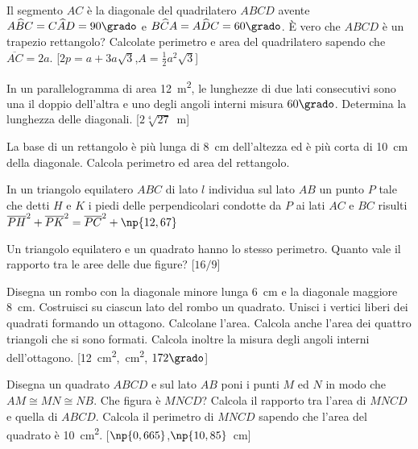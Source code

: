 \begin{multicols}{2}
\begin{esercizio}
\label{ese:7.34}
Il segmento \(AC\) è la diagonale del quadrilatero \(ABCD\) avente 
\(A\widehat{B}C=C\widehat{A}D=90\grado\) e 
\(B\widehat{C}A=A\widehat{D}C=60\grado\). \`E vero che \(ABCD\) è un 
trapezio rettangolo? Calcolate perimetro e area del quadrilatero 
sapendo che \(\overline{AC}=2a\).
\hfill[\(2p=a+3a\sqrt{3}\),\quad \(A=\frac{1}{2}a^2\sqrt{3}\)]
\end{esercizio}

\begin{esercizio}
\label{ese:7.36}
In un parallelogramma di area 12~m\textsuperscript{2}, le lunghezze 
di due lati consecutivi sono una il doppio dell'altra e uno degli 
angoli interni misura \(60\grado\). Determina la lunghezza delle 
diagonali.
\hfill[\(2\sqrt[4]{27}\)~m]
\end{esercizio}

\begin{esercizio}
\label{ese:7.38}
La base di un rettangolo è più lunga di 8~cm dell'altezza ed è più 
corta di 10~cm della diagonale. Calcola perimetro ed area del 
rettangolo.
\end{esercizio}

\begin{esercizio}
\label{ese:7.39}
In un triangolo equilatero \(ABC\) di lato \(l\) individua sul lato \(AB\) 
un punto \(P\) tale che detti \(H\) e \(K\) i piedi delle perpendicolari 
condotte da \(P\) ai lati \(AC\) e \(BC\) risulti 
\(\overline{PH}^2+\overline{PK}^2=\overline{PC}^2+\np{12,67}\)
\end{esercizio}

\begin{esercizio}
\label{ese:7.40}
Un triangolo equilatero e un quadrato hanno lo stesso perimetro. 
Quanto vale il rapporto tra le aree delle due figure?
\hfill[\(16/9\)]
\end{esercizio}

\begin{esercizio}
\label{ese:7.43}
Disegna un rombo con la diagonale minore lunga 6~cm e la diagonale 
maggiore 8~cm. Costruisci su ciascun lato del rombo un quadrato. 
Unisci i vertici liberi dei quadrati formando un ottagono. Calcolane 
l'area. Calcola anche l'area dei quattro triangoli che si sono 
formati. Calcola inoltre la misura degli angoli interni dell'ottagono.
\hfill[12~cm\textsuperscript{2},~cm\textsuperscript{2},\quad 
\(172\grado\)]
\end{esercizio}

\begin{esercizio}
\label{ese:7.44}
Disegna un quadrato \(ABCD\) e sul lato \(AB\) poni i punti \(M\) ed \(N\) in 
modo che \(AM\cong MN\cong NB\). Che figura è \(MNCD\)? Calcola il 
rapporto tra l'area di \(MNCD\) e quella di \(ABCD\). Calcola il 
perimetro di \(MNCD\) sapendo che l'area del quadrato è 
10~cm\textsuperscript{2}.
\hfill[\(\np{0,665}\),\quad \(\np{10,85}\)~cm]
\end{esercizio}


\end{multicols}
